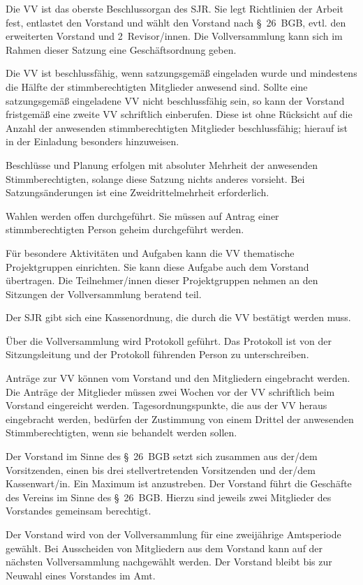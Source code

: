 \documentclass[10pt,a4paper,oneside,parskip=half]{scrartcl}
\begin{document}
\begin{contract}
Die VV ist das oberste Beschlussorgan des SJR. Sie legt Richtlinien der Arbeit fest, entlastet den Vorstand und wählt den Vorstand nach §~26~BGB, evtl. den erweiterten Vorstand und 2~Revisor/innen. Die Vollversammlung kann sich im Rahmen dieser Satzung eine Geschäftsordnung geben.

Die VV ist beschlussfähig, wenn satzungsgemäß eingeladen wurde und mindestens die Hälfte der stimmberechtigten Mitglieder anwesend sind. Sollte eine satzungsgemäß eingeladene VV nicht beschlussfähig sein, so kann der Vorstand fristgemäß eine zweite VV schriftlich einberufen. Diese ist ohne Rücksicht auf die Anzahl der anwesenden stimmberechtigten Mitglieder beschlussfähig; hierauf ist in der Einladung besonders hinzuweisen.

Beschlüsse und Planung erfolgen mit absoluter Mehrheit der anwesenden Stimmberechtigten, solange diese Satzung nichts anderes vorsieht. Bei Satzungsänderungen ist eine Zweidrittelmehrheit erforderlich.

Wahlen werden offen durchgeführt. Sie müssen auf Antrag einer stimmberechtigten Person geheim durchgeführt werden.

Für besondere Aktivitäten und Aufgaben kann die VV thematische Projektgruppen einrichten. Sie kann diese Aufgabe auch dem Vorstand übertragen. Die Teilnehmer/innen dieser Projektgruppen nehmen an den Sitzungen der Vollversammlung beratend teil.

Der SJR gibt sich eine Kassenordnung, die durch die VV bestätigt werden muss.

Über die Vollversammlung wird Protokoll geführt. Das Protokoll ist von der Sitzungsleitung und der Protokoll führenden Person zu unterschreiben.

Anträge zur VV können vom Vorstand und den Mitgliedern eingebracht werden. Die Anträge der Mitglieder müssen zwei Wochen vor der VV schriftlich beim Vorstand eingereicht werden. Tagesordnungspunkte, die aus der VV heraus eingebracht werden, bedürfen der Zustimmung von einem Drittel der anwesenden Stimmberechtigten, wenn sie behandelt werden sollen.

Der Vorstand im Sinne des §~26~BGB setzt sich zusammen aus der/dem Vorsitzenden, einen bis drei stellvertretenden Vorsitzenden und der/dem Kassenwart/in. Ein Maximum ist anzustreben. Der Vorstand führt die Geschäfte des Vereins im Sinne des §~26~BGB. Hierzu sind jeweils zwei Mitglieder des Vorstandes gemeinsam berechtigt.

Der Vorstand wird von der Vollversammlung für eine zweijährige Amtsperiode gewählt. Bei Ausscheiden von Mitgliedern aus dem Vorstand kann auf der nächsten Vollversammlung nachgewählt werden. Der Vorstand bleibt bis zur Neuwahl eines Vorstandes im Amt.


\end{contract}
\end{document}
